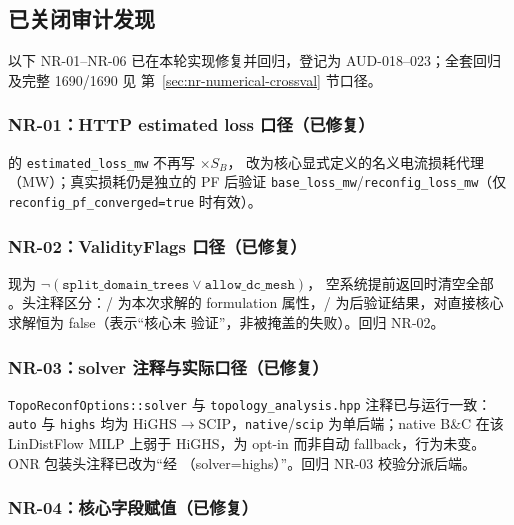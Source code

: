 \subsection{已关闭审计发现}

以下 NR-01--NR-06 已在本轮实现修复并回归，登记为 AUD-018--023；全套回归及完整 1690/1690 见
第~\ref{sec:nr-numerical-crossval} 节口径。

\subsubsection{NR-01：HTTP estimated loss 口径（已修复）}

 的 \texttt{estimated\_loss\_mw} 不再写 $\times S_B$，
改为核心显式定义的名义电流损耗代理 （MW）；真实损耗仍是独立的 PF 后验证
\texttt{base\_loss\_mw}/\texttt{reconfig\_loss\_mw}（仅 \texttt{reconfig\_pf\_converged=true} 时有效）。

\subsubsection{NR-02：ValidityFlags 口径（已修复）}

 现为 $\lnot(\texttt{split\_domain\_trees}\lor\texttt{allow\_dc\_mesh})$，
空系统提前返回时清空全部 。头注释区分：/ 为本次求解的
formulation 属性，/ 为后验证结果，对直接核心求解恒为 false（表示“核心未
验证”，非被掩盖的失败）。回归  NR-02。

\subsubsection{NR-03：solver 注释与实际口径（已修复）}

\texttt{TopoReconfOptions::solver} 与 \texttt{topology\_analysis.hpp} 注释已与运行一致：\texttt{auto}
与 \texttt{highs} 均为 HiGHS$\to$SCIP，\texttt{native}/\texttt{scip} 为单后端；native B\&C 在该
LinDistFlow MILP 上弱于 HiGHS，为 opt-in 而非自动 fallback，行为未变。ONR 包装头注释已改为“经
（solver=highs）”。回归  NR-03 校验分派后端。

\subsubsection{NR-04：核心字段赋值（已修复）}

